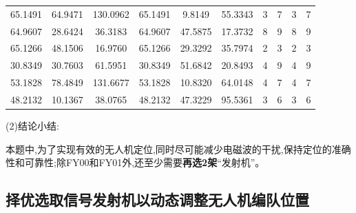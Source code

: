\documentclass[withoutpreface,bwprint]{cumcmthesis} %
\begin{document}
\begin{table}[htbp!]
\begin{tabular}{@{}cccccccccc@{}}
							65.1491                          & 64.9471                          & 130.0962                         & 65.1491                          & 9.8149                           & 55.3343                          & 3                    & 7                    & 3                      & 7                      \\
							64.9607                          & 28.6424                          & 36.3183                          & 64.9607                          & 47.5875                          & 17.3732                          & 8                    & 9                    & 8                      & 9                      \\
							65.1266                          & 48.1506                          & 16.9760                          & 65.1266                          & 29.3292                          & 35.7974                          & 2                    & 3                    & 2                      & 3                      \\
							30.8349                          & 30.7603                          & 61.5951                          & 30.8349                          & 51.6842                          & 20.8493                          & 4                    & 9                    & 4                      & 9                      \\
							53.1828                          & 78.4849                          & 131.6677                         & 53.1828                          & 10.8320                          & 64.0148                          & 4                    & 7                    & 4                      & 7                      \\
							48.2132                          & 10.1367                          & 38.0765                          & 48.2132                          & 47.3229                          & 95.5361                          & 3                    & 6                    & 3                      & 6                      \\ \bottomrule
						\end{tabular}
					\end{table}
					(2)结论小结:
					
					本题中,为了实现有效的无人机定位,同时尽可能减少电磁波的干扰,保持定位的准确性和可靠性;除FY00和FY01外,还至少需要\textbf{再选2架}“发射机”。
					
		\subsection{择优选取信号发射机以动态调整无人机编队位置}
			
\end{document}

